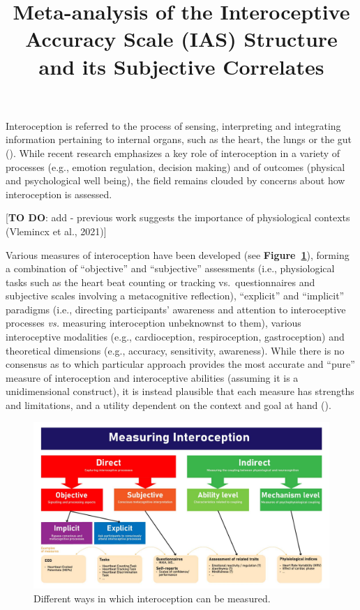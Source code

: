 \documentclass[
  man,
  floatsintext,
  longtable,
  nolmodern,
  notxfonts,
  notimes,
  colorlinks=true,linkcolor=blue,citecolor=blue,urlcolor=blue]{apa7}
\title{Meta-analysis of the Interoceptive Accuracy Scale (IAS) Structure
and its Subjective Correlates}
\affiliation{
{School of Psychology, University of Sussex}}
\begin{document}
\maketitle


\setcounter{secnumdepth}{-\maxdimen} %

\setlength\LTleft{0pt}

\resetlinenumber[1]

Interoception is referred to the process of sensing, interpreting and
integrating information pertaining to internal organs, such as the
heart, the lungs or the gut (). While recent research emphasizes a key role of interoception in
a variety of processes (e.g., emotion regulation, decision making) and
of outcomes (physical and psychological well being), the field remains
clouded by concerns about how interoception is assessed.

{[}\textbf{TO DO}: add - previous work suggests the importance of
physiological contexts (Vlemincx et al., 2021){]}

Various measures of interoception have been developed (see
\textbf{Figure~\ref{fig-measures}}), forming a combination of
``objective'' and ``subjective'' assessments (i.e., physiological tasks
such as the heart beat counting or tracking vs.~questionnaires and
subjective scales involving a metacognitive reflection), ``explicit''
and ``implicit'' paradigms (i.e., directing participants' awareness and
attention to interoceptive processes \emph{vs.} measuring interoception
unbeknownst to them), various interoceptive modalities (e.g.,
cardioception, respiroception, gastroception) and theoretical dimensions
(e.g., accuracy, sensitivity, awareness). While there is no consensus as
to which particular approach provides the most accurate and ``pure''
measure of interoception and interoceptive abilities (assuming it is a
unidimensional construct), it is instead plausible that each measure has
strengths and limitations, and a utility dependent on the context and
goal at hand ().

\begin{figure}[!htbp]

{\caption{{Different ways in which interoception can be
measured.}{\label{fig-measures}}}}

\includegraphics[width=1\textwidth,height=\textheight]{figures/MeasuringInteroception.jpg}

\end{figure}
\end{document}
